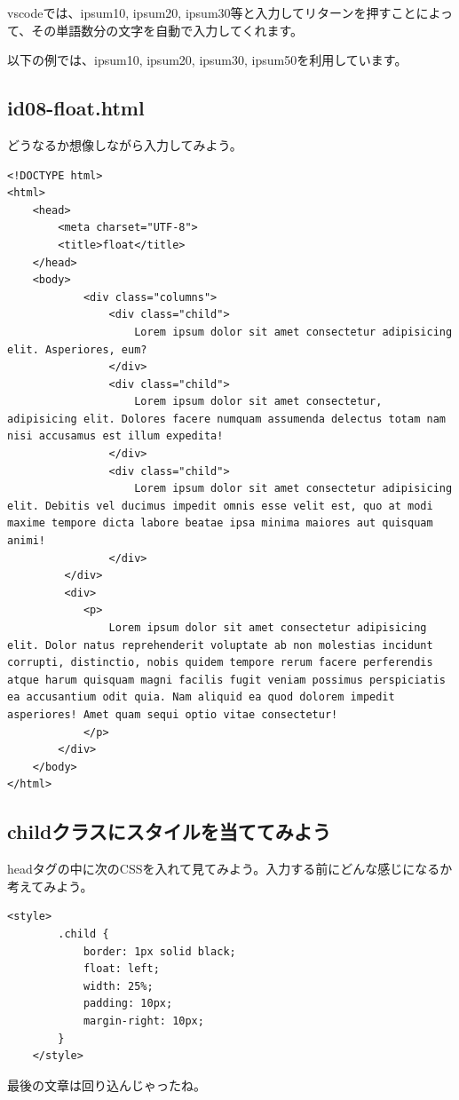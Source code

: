 \documentclass[mingoth,11pt,a4j,uplatex,dvipdfmx]{jsarticle}
\begin{document}
vscodeでは、ipsum10, ipsum20, ipsum30等と入力してリターンを押すことによって、その単語数分の文字を自動で入力してくれます。

以下の例では、ipsum10, ipsum20, ipsum30, ipsum50を利用しています。



\subsection{id08-float.html}
どうなるか想像しながら入力してみよう。
\begin{lstlisting}[caption=HTML部分]
<!DOCTYPE html>
<html>
	<head>
		<meta charset="UTF-8">
		<title>float</title>
	</head>
	<body>
    		<div class="columns">
		        <div class="child">
		            Lorem ipsum dolor sit amet consectetur adipisicing elit. Asperiores, eum?
		        </div>
		        <div class="child">
		            Lorem ipsum dolor sit amet consectetur, adipisicing elit. Dolores facere numquam assumenda delectus totam nam nisi accusamus est illum expedita!
		        </div>
		        <div class="child">
		            Lorem ipsum dolor sit amet consectetur adipisicing elit. Debitis vel ducimus impedit omnis esse velit est, quo at modi maxime tempore dicta labore beatae ipsa minima maiores aut quisquam animi!
		        </div>
		 </div>
		 <div>
			<p>
				Lorem ipsum dolor sit amet consectetur adipisicing elit. Dolor natus reprehenderit voluptate ab non molestias incidunt corrupti, distinctio, nobis quidem tempore rerum facere perferendis atque harum quisquam magni facilis fugit veniam possimus perspiciatis ea accusantium odit quia. Nam aliquid ea quod dolorem impedit asperiores! Amet quam sequi optio vitae consectetur!
			</p>
		</div>
	</body>
</html>
\end{lstlisting}


\subsection{childクラスにスタイルを当ててみよう}
headタグの中に次のCSSを入れて見てみよう。入力する前にどんな感じになるか考えてみよう。
\begin{lstlisting}[caption=CSS部分1]
    <style>
        .child {
            border: 1px solid black;
            float: left;
            width: 25%;
            padding: 10px;
            margin-right: 10px;
        }
    </style>

\end{lstlisting}
最後の文章は回り込んじゃったね。
\end{document}
